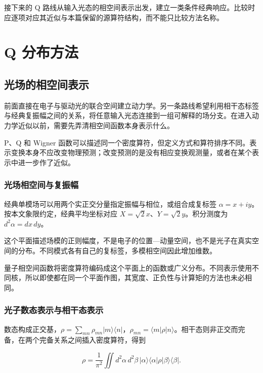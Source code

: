 \documentclass[UTF8,a4paper,zihao=-4,openany,fontset=fandol]{ctexbook}
\begin{document}
接下来的 Q 路线从输入光态的相空间表示出发，建立一类条件经典响应。比较时应逐项对应其近似与本篇保留的源算符结构，而不能只比较方法名称。


\part{Q 分布方法}


\chapter{光场的相空间表示}\label{ch:09}


前面直接在电子与驱动光的联合空间建立动力学。另一条路线希望利用相干态标签与经典复振幅之间的关系，将任意输入光态连接到一组可解释的场分支。在进入动力学近似以前，需要先弄清相空间函数本身表示什么。



P、Q 和 Wigner 函数可以描述同一个密度算符，但定义方式和算符排序不同。表示变换本身不应改变物理预测；改变预测的是没有相应变换观测量，或者在某个表示中进一步作了近似。



\section{光场相空间与复振幅}\label{sec:09:1}


经典单模场可以用两个实正交分量指定振幅与相位，或组合成复标签 $\alpha=x+iy$。按本文象限约定，经典平均坐标对应 $X=\sqrt2x$、$Y=\sqrt2y$。积分测度为 $d^2\alpha=dx\,dy$。



这个平面描述场模的正则幅度，不是电子的位置—动量空间，也不是光子在真实空间的分布。不同模式各有自己的复标签，多模相空间因此增加维数。



量子相空间函数将密度算符编码成这个平面上的函数或广义分布。不同表示使用不同核，所以即使都在同一个平面作图，其宽度、正负性与计算矩的方法也未必相同。



\section{光子数态表示与相干态表示}\label{sec:09:2}


数态构成正交基，$\rho=\sum_{mn}\rho_{mn}|m\rangle\langle n|$，$\rho_{mn}=\langle m|\rho|n\rangle$。相干态则非正交而完备，在两个完备关系之间插入密度算符，得到



\begin{equation*}
\rho=\frac1{\pi^2}\iint d^2\alpha\,d^2\beta\,
|\alpha\rangle\langle\alpha|\rho|\beta\rangle\langle\beta|.
\tag{9.1}\label{eq:9.1}
\end{equation*}
\end{document}
